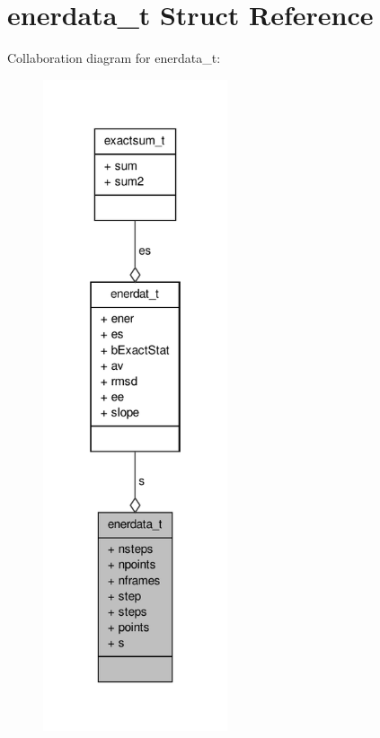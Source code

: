 \hypertarget{structenerdata__t}{\section{enerdata\-\_\-t \-Struct \-Reference}
\label{structenerdata__t}
}


\-Collaboration diagram for enerdata\-\_\-t\-:
\nopagebreak
\begin{figure}[H]
\begin{center}
\leavevmode
\includegraphics[width=154pt]{structenerdata__t__coll__graph}
\end{center}
\end{figure}
